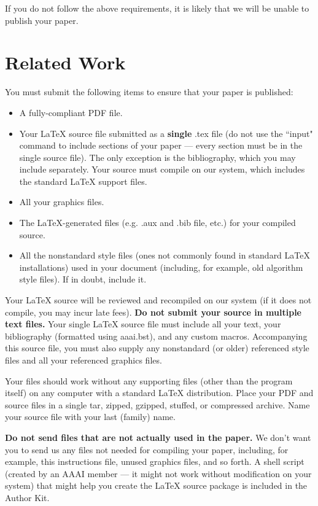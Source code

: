 \documentclass[letterpaper]{article}
\begin{document}
	If you do not follow the above requirements, it is likely that we will be unable to publish your paper.
	
	\section{Related Work}
	You must submit the following items to ensure that your paper is published:
	\begin{itemize}
		\item A fully-compliant PDF file.
		\item Your  \LaTeX{}  source file submitted as a \textbf{single} .tex file (do not use the ``input" command to include sections of your paper --- every section must be in the single source file). The only exception is the bibliography, which you may include separately. Your source must compile on our system, which includes the standard \LaTeX{} support files.
		\item All your graphics files.
		\item The \LaTeX{}-generated files (e.g. .aux and .bib file, etc.) for your compiled source.
		\item All the nonstandard style files (ones not commonly found in standard \LaTeX{} installations) used in your document (including, for example, old algorithm style files). If in doubt, include it.
	\end{itemize}
	
	Your \LaTeX{} source will be reviewed and recompiled on our system (if it does not compile, you may incur late fees).   \textbf{Do not submit your source in multiple text files.} Your single \LaTeX{} source file must include all your text, your bibliography (formatted using aaai.bst), and any custom macros. Accompanying this source file, you must also supply any nonstandard (or older) referenced style files and all your referenced graphics files. 
	
	Your files should work without any supporting files (other than the program itself) on any computer with a standard \LaTeX{} distribution. Place your PDF and source files in a single tar, zipped, gzipped, stuffed, or compressed archive. Name your source file with your last (family) name.
	
	\textbf{Do not send files that are not actually used in the paper.} We don't want you to send us any files not needed for compiling your paper, including, for example, this instructions file, unused graphics files, and so forth.  A shell script (created by an AAAI member --- it might not work without modification on your system) that might help you create the \LaTeX{} source package is included in the Author Kit.
	
\end{document}
